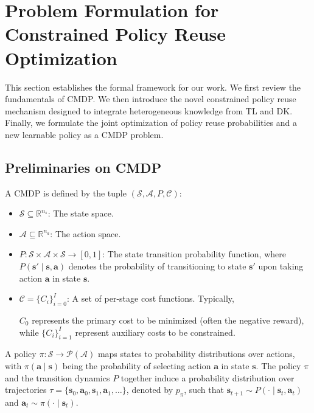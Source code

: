 \documentclass{IEEEtran}
\begin{document}
\section{Problem Formulation for Constrained Policy Reuse Optimization}
\label{sec:Preliminaries}
This section establishes the formal framework for our work. We first review the fundamentals of CMDP. We then introduce the novel constrained policy reuse mechanism designed to integrate heterogeneous knowledge from TL and DK. Finally, we formulate the joint optimization of policy reuse probabilities and a new learnable policy as a CMDP problem.

\subsection{Preliminaries on CMDP}
\label{subsec:Problem-Formulation}
A CMDP is defined by the tuple $(\mathcal{S},\mathcal{A},P,\mathcal{C})$:

\begin{itemize}
\item $\mathcal{S}\subseteq\mathbb{R}^{n_{s}}$: The state space.
\item $\mathcal{A}\subseteq\mathbb{R}^{n_{a}}$: The action space.
\item $P:\mathcal{S}\times\mathcal{A}\times\mathcal{S}\rightarrow[0,1]$: The state transition probability function, where $P(\boldsymbol{s}'\mid\boldsymbol{s},\boldsymbol{a})$ denotes the probability of transitioning to state $\boldsymbol{s}'$ upon taking action $\boldsymbol{a}$ in state $\boldsymbol{s}$.
\item $\mathcal{C}=\{C_{i}\}_{i=0}^{I}$: A set of per-stage cost functions. Typically,

$C_{0}$ represents the primary cost to be minimized (often the negative reward), while $\{C_{i}\}_{i=1}^{I}$ represent auxiliary costs to be constrained.
\end{itemize}

A policy $\pi:\mathcal{S}\rightarrow\mathcal{P}(\mathcal{A})$ maps states to probability distributions over actions, with $\pi(\boldsymbol{a}\mid\boldsymbol{s})$ being the probability of selecting action $\boldsymbol{a}$ in state $\boldsymbol{s}$. The policy $\pi$ and the transition dynamics $P$ together induce a probability distribution over trajectories $\tau=\{\boldsymbol{s}_{0},\boldsymbol{a}_{0},\boldsymbol{s}_{1},\boldsymbol{a}_{1},\ldots\}$, denoted by $p_{\pi}$, such that $\boldsymbol{s}_{t+1}\sim P(\cdot\mid\boldsymbol{s}_{t},\boldsymbol{a}_{t})$ and $\boldsymbol{a}_{t}\sim\pi(\cdot\mid\boldsymbol{s}_{t})$.
\end{document}
